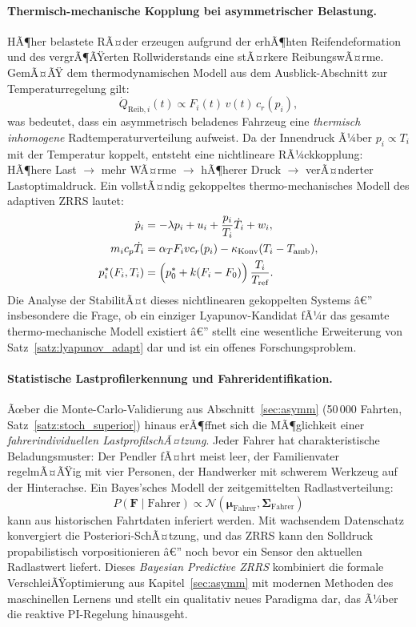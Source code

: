 ﻿\documentclass[a4paper,12pt]{article}
\theoremstyle{definition}
\begin{document}
\paragraph{Thermisch-mechanische Kopplung bei asymmetrischer Belastung.}
HÃ¶her belastete RÃ¤der erzeugen aufgrund der erhÃ¶hten Reifendeformation
und des vergrÃ¶ÃŸerten Rollwiderstands eine stÃ¤rkere ReibungswÃ¤rme. GemÃ¤ÃŸ
dem thermodynamischen Modell aus dem Ausblick-Abschnitt zur
Temperaturregelung gilt:
\[
    \dot{Q}_{\text{Reib},i}(t) \propto F_i(t)\,v(t)\,c_r(p_i),
\]
was bedeutet, dass ein asymmetrisch beladenes Fahrzeug eine \emph{thermisch
inhomogene} Radtemperaturverteilung aufweist. Da der Innendruck Ã¼ber
$p_i \propto T_i$ mit der Temperatur koppelt, entsteht eine nichtlineare
RÃ¼ckkopplung: HÃ¶here Last $\to$ mehr WÃ¤rme $\to$ hÃ¶herer Druck $\to$
verÃ¤nderter Lastoptimaldruck. Ein vollstÃ¤ndig gekoppeltes
thermo-mechanisches Modell des adaptiven ZRRS lautet:
\begin{align*}
    \dot{p}_i &= -\lambda p_i + u_i + \frac{p_i}{T_i}\dot{T}_i + w_i,\\
    m_i c_p \dot{T}_i &= \alpha_T F_i v c_r(p_i)
    - \kappa_{\text{Konv}}(T_i - T_{\text{amb}}),\\
    p^*_i(F_i, T_i) &= \Bigl(p^*_0 + k(F_i - F_0)\Bigr)\,\frac{T_i}{T_{\text{ref}}}.
\end{align*}
Die Analyse der StabilitÃ¤t dieses nichtlinearen gekoppelten Systems â€”
insbesondere die Frage, ob ein einziger Lyapunov-Kandidat fÃ¼r das gesamte
thermo-mechanische Modell existiert â€” stellt eine wesentliche Erweiterung
von Satz~\ref{satz:lyapunov_adapt} dar und ist ein offenes
Forschungsproblem.

\paragraph{Statistische Lastprofilerkennung und Fahreridentifikation.}
Ãœber die Monte-Carlo-Validierung aus Abschnitt~\ref{sec:asymm}
(50\,000 Fahrten, Satz~\ref{satz:stoch_superior}) hinaus erÃ¶ffnet sich
die MÃ¶glichkeit einer \emph{fahrerindividuellen LastprofilschÃ¤tzung}.
Jeder Fahrer hat charakteristische Beladungsmuster: Der Pendler fÃ¤hrt meist
leer, der Familienvater regelmÃ¤ÃŸig mit vier Personen, der Handwerker mit
schwerem Werkzeug auf der Hinterachse. Ein Bayes'sches Modell der
zeitgemittelten Radlastverteilung:
\[
    P(\mathbf{F} \mid \text{Fahrer}) \propto
    \mathcal{N}(\boldsymbol{\mu}_{\text{Fahrer}}, \boldsymbol{\Sigma}_{\text{Fahrer}})
\]
kann aus historischen Fahrtdaten inferiert werden. Mit wachsendem
Datenschatz konvergiert die Posteriori-SchÃ¤tzung, und das ZRRS kann den
Solldruck propabilistisch vorpositionieren â€” noch bevor ein Sensor den
aktuellen Radlastwert liefert. Dieses \emph{Bayesian Predictive ZRRS}
kombiniert die formale VerschleiÃŸoptimierung aus Kapitel~\ref{sec:asymm}
mit modernen Methoden des maschinellen Lernens und stellt ein qualitativ
neues Paradigma dar, das Ã¼ber die reaktive PI-Regelung hinausgeht.
\end{document}
